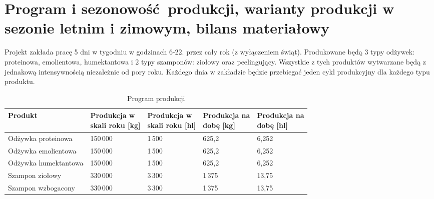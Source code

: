 \section{Program i sezonowość produkcji, warianty produkcji w sezonie letnim i zimowym, bilans materiałowy}

Projekt zakłada pracę 5 dni w tygodniu w godzinach 6-22. przez cały rok (z wyłączeniem świąt). Produkowane będą 3 typy odżywek: proteinowa, emolientowa, humektantowa i 2 typy szamponów: ziołowy oraz peelingujący. Wszystkie z tych produktów wytwarzane będą z jednakową intensywnością niezależnie od pory roku. Każdego dnia w zakładzie będzie przebiegać jeden cykl produkcyjny dla każdego typu produktu.

\begin{table}[h]
	\centering
	\caption{Program produkcji}
	\begin{tabular}{lllll}
		\hline
		\textbf{Produkt} & \makecell[l]{\textbf{Produkcja w} \\ \textbf{skali roku [kg]}} & \makecell[l]{\textbf{Produkcja w} \\ \textbf{skali roku [hl]}} & \makecell[l]{\textbf{Produkcja na} \\ \textbf{dobę [kg]}} & \makecell[l]{\textbf{Produkcja na} \\  \textbf{dobę [hl]}} \\
		\hline\hline
	Odżywka proteinowa & 150\,000 & 1\,500 & 625,2 & 6,252 \\
	Odżywka emolientowa & 150\,000 & 1\,500 & 625,2 & 6,252 \\
	Odżywka humektantowa & 150\,000 & 1\,500 & 625,2 & 6,252 \\
	Szampon ziołowy & 330\,000 & 3\,300 & 1\,375 & 13,75 \\
	Szampon wzbogacony & 330\,000 & 3\,300 & 1\,375 & 13,75 \\
	\hline
	\end{tabular}
\end{table}

